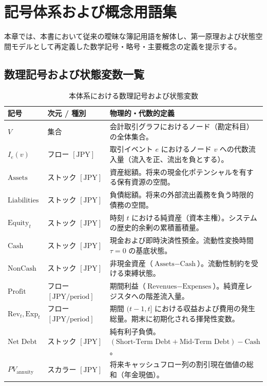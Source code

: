 \ifja
\appendix
\chapter{記号体系および概念用語集}
\label{chap:symbols_and_glossary}

本章では、本書において従来の曖昧な簿記用語を解体し、第一原理および状態空間モデルとして再定義した数学記号・略号・主要概念の定義を提示する。

\section{数理記号および状態変数一覧}
\begin{table}[htbp]
\centering
\small
\begin{tabular}{llp{9.5cm}}
\toprule
\textbf{記号} & \textbf{次元 / 種別} & \textbf{物理的・代数的定義} \\
\midrule
$V$ & 集合 & 会計取引グラフにおけるノード（勘定科目）の全体集合。 \\
$I_e(v)$ & フロー $[\text{JPY}]$ & 取引イベント $e$ におけるノード $v$ への代数流入量（流入を正、流出を負とする）。 \\
$\text{Assets}$ & ストック $[\text{JPY}]$ & 資産総額。将来の現金化ポテンシャルを有する保有資源の空間。 \\
$\text{Liabilities}$ & ストック $[\text{JPY}]$ & 負債総額。将来の外部流出義務を負う時限的債務の空間。 \\
$\text{Equity}_t$ & ストック $[\text{JPY}]$ & 時刻 $t$ における純資産（資本主権）。システムの歴史的余剰の累積蓄積量。 \\
$\text{Cash}$ & ストック $[\text{JPY}]$ & 現金および即時決済性預金。流動性変換時間 $\tau = 0$ の基底状態。 \\
$\text{NonCash}$ & ストック $[\text{JPY}]$ & 非現金資産（$\text{Assets} - \text{Cash}$）。流動性制約を受ける束縛状態。 \\
$\text{Profit}$ & フロー $[\text{JPY}/\text{period}]$ & 期間利益（$\text{Revenues} - \text{Expenses}$）。純資産レジスタへの階差流入量。 \\
$\text{Rev}_t, \text{Exp}_t$ & フロー $[\text{JPY}/\text{period}]$ & 期間 $(t-1, t]$ における収益および費用の発生総量。期末に初期化される揮発性変数。 \\
$\text{Net Debt}$ & ストック $[\text{JPY}]$ & 純有利子負債。$(\text{Short-Term Debt} + \text{Mid-Term Debt}) - \text{Cash}$。 \\
$PV_{\text{annuity}}$ & スカラー $[\text{JPY}]$ & 将来キャッシュフロー列の割引現在価値の総和（年金現価）。 \\
\bottomrule
\end{tabular}
\caption{本体系における数理記号および状態変数}
\end{table}


